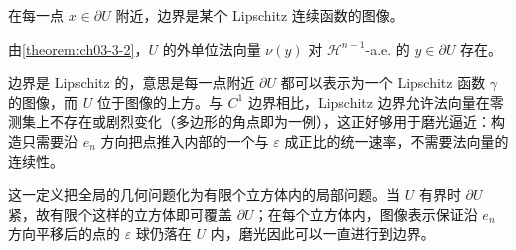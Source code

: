 \documentclass[../../main.tex]{subfiles}%
\begin{document}
在每一点 $x\in\partial U$ 附近，边界是某个 Lipschitz 连续函数的图像。

\begin{remark}\label{remark:ch04-def-4-4-法向量}
由\cref{theorem:ch03-3-2}，$U$ 的外单位法向量 $\nu(y)$ 对 $\mathcal{H}^{n-1}$-a.e. 的 $y\in\partial U$ 存在。%
\end{remark}

\begin{remark}\label{remark:ch04-def-4-4-动机}
边界是 Lipschitz 的，意思是每一点附近 $\partial U$ 都可以表示为一个 Lipschitz 函数 $\gamma$ 的图像，而 $U$ 位于图像的上方。与 $C^1$ 边界相比，Lipschitz 边界允许法向量在零测集上不存在或剧烈变化（多边形的角点即为一例），这正好够用于磨光逼近：构造只需要沿 $e_n$ 方向把点推入内部的一个与 $\varepsilon$ 成正比的统一速率，不需要法向量的连续性。

这一定义把全局的几何问题化为有限个立方体内的局部问题。当 $U$ 有界时 $\partial U$ 紧，故有限个这样的立方体即可覆盖 $\partial U$；在每个立方体内，图像表示保证沿 $e_n$ 方向平移后的点的 $\varepsilon$ 球仍落在 $U$ 内，磨光因此可以一直进行到边界。
\end{remark}
\end{document}
